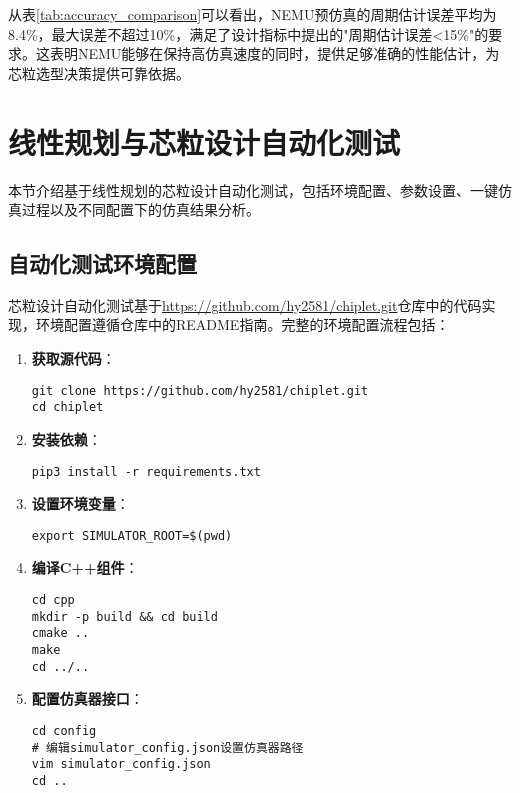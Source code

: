 \documentclass[bachelor]{thesis-uestc}
\begin{document}
从表\ref{tab:accuracy_comparison}可以看出，NEMU预仿真的周期估计误差平均为8.4\%，最大误差不超过10\%，满足了设计指标中提出的"周期估计误差<15\%"的要求。这表明NEMU能够在保持高仿真速度的同时，提供足够准确的性能估计，为芯粒选型决策提供可靠依据。

\section{线性规划与芯粒设计自动化测试}

本节介绍基于线性规划的芯粒设计自动化测试，包括环境配置、参数设置、一键仿真过程以及不同配置下的仿真结果分析。

\subsection{自动化测试环境配置}

芯粒设计自动化测试基于\url{https://github.com/hy2581/chiplet.git}仓库中的代码实现，环境配置遵循仓库中的README指南。完整的环境配置流程包括：

\begin{enumerate}
    \item \textbf{获取源代码}：
    \begin{verbatim}
git clone https://github.com/hy2581/chiplet.git
cd chiplet
    \end{verbatim}

    \item \textbf{安装依赖}：
    \begin{verbatim}
pip3 install -r requirements.txt
    \end{verbatim}

    \item \textbf{设置环境变量}：
    \begin{verbatim}
export SIMULATOR_ROOT=$(pwd)
    \end{verbatim}

    \item \textbf{编译C++组件}：
    \begin{verbatim}
cd cpp
mkdir -p build && cd build
cmake ..
make
cd ../..
    \end{verbatim}

    \item \textbf{配置仿真器接口}：
    \begin{verbatim}
cd config
# 编辑simulator_config.json设置仿真器路径
vim simulator_config.json
cd ..
    \end{verbatim}
\end{enumerate}
\end{document}
